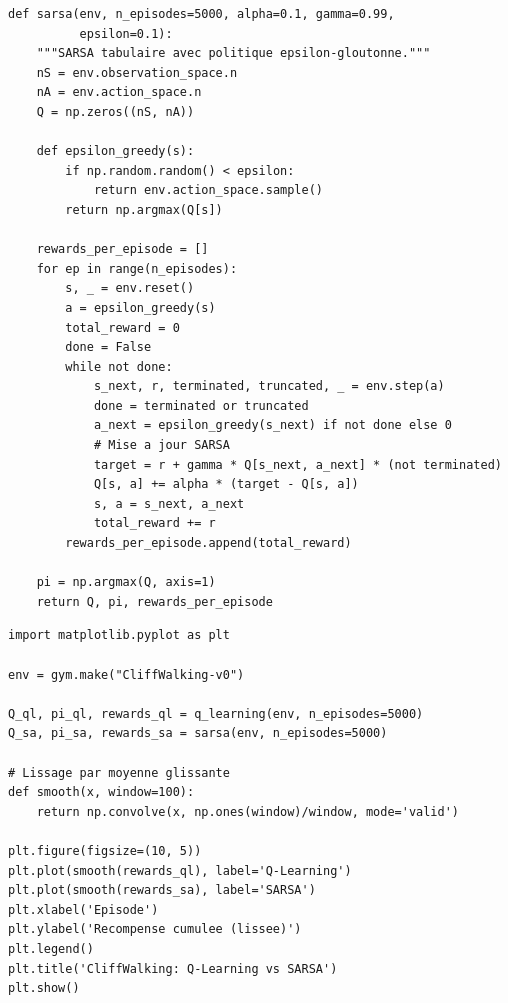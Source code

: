 \begin{codeblock}[title=\textbf{SARSA tabulaire}]
\begin{verbatim}
def sarsa(env, n_episodes=5000, alpha=0.1, gamma=0.99,
          epsilon=0.1):
    """SARSA tabulaire avec politique epsilon-gloutonne."""
    nS = env.observation_space.n
    nA = env.action_space.n
    Q = np.zeros((nS, nA))

    def epsilon_greedy(s):
        if np.random.random() < epsilon:
            return env.action_space.sample()
        return np.argmax(Q[s])

    rewards_per_episode = []
    for ep in range(n_episodes):
        s, _ = env.reset()
        a = epsilon_greedy(s)
        total_reward = 0
        done = False
        while not done:
            s_next, r, terminated, truncated, _ = env.step(a)
            done = terminated or truncated
            a_next = epsilon_greedy(s_next) if not done else 0
            # Mise a jour SARSA
            target = r + gamma * Q[s_next, a_next] * (not terminated)
            Q[s, a] += alpha * (target - Q[s, a])
            s, a = s_next, a_next
            total_reward += r
        rewards_per_episode.append(total_reward)

    pi = np.argmax(Q, axis=1)
    return Q, pi, rewards_per_episode
\end{verbatim}
\end{codeblock}

\begin{codeblock}[title=\textbf{Comparaison sur CliffWalking}]
\begin{verbatim}
import matplotlib.pyplot as plt

env = gym.make("CliffWalking-v0")

Q_ql, pi_ql, rewards_ql = q_learning(env, n_episodes=5000)
Q_sa, pi_sa, rewards_sa = sarsa(env, n_episodes=5000)

# Lissage par moyenne glissante
def smooth(x, window=100):
    return np.convolve(x, np.ones(window)/window, mode='valid')

plt.figure(figsize=(10, 5))
plt.plot(smooth(rewards_ql), label='Q-Learning')
plt.plot(smooth(rewards_sa), label='SARSA')
plt.xlabel('Episode')
plt.ylabel('Recompense cumulee (lissee)')
plt.legend()
plt.title('CliffWalking: Q-Learning vs SARSA')
plt.show()
\end{verbatim}
\end{codeblock}

